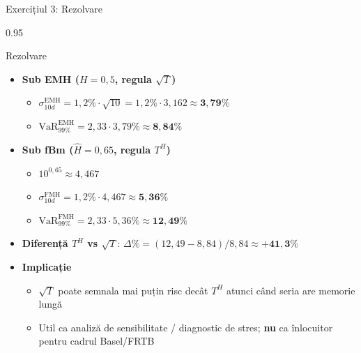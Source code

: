 \documentclass[9pt, aspectratio=169, t]{beamer}
\begin{document}
\begin{frame}[shrink=15]{Exercițiul 3: Rezolvare}
\begin{cminipage}{0.95\textwidth}
\begin{exampleblock}{Rezolvare}
\begin{itemize}\setlength{\itemsep}{0pt}
    \item \textbf{Sub EMH ($H=0{,}5$, regula $\sqrt T$)}
    \begin{itemize}\setlength{\itemsep}{0pt}
        \item $\sigma_{10d}^{\text{EMH}}=1{,}2\%\cdot\sqrt{10}=1{,}2\%\cdot 3{,}162\approx \mathbf{3{,}79\%}$
        \item $\text{VaR}_{99\%}^{\text{EMH}}=2{,}33\cdot 3{,}79\%\approx \mathbf{8{,}84\%}$
    \end{itemize}
    \item \textbf{Sub fBm ($\hat H=0{,}65$, regula $T^H$)}
    \begin{itemize}\setlength{\itemsep}{0pt}
        \item $10^{0{,}65}\approx 4{,}467$
        \item $\sigma_{10d}^{\text{FMH}}=1{,}2\%\cdot 4{,}467\approx \mathbf{5{,}36\%}$
        \item $\text{VaR}_{99\%}^{\text{FMH}}=2{,}33\cdot 5{,}36\%\approx \mathbf{12{,}49\%}$
    \end{itemize}
    \item \textbf{Diferență $T^H$ vs $\sqrt T$}: $\Delta\%=(12{,}49-8{,}84)/8{,}84\approx \mathbf{+41{,}3\%}$
    \item \textbf{Implicație}
    \begin{itemize}\setlength{\itemsep}{0pt}
        \item $\sqrt T$ poate semnala mai puțin risc decât $T^H$ atunci când seria are memorie lungă
        \item Util ca analiză de sensibilitate / diagnostic de stres; \textbf{nu} ca înlocuitor pentru cadrul Basel/FRTB
    \end{itemize}
\end{itemize}
\end{exampleblock}
\end{cminipage}
\end{frame}
\end{document}
